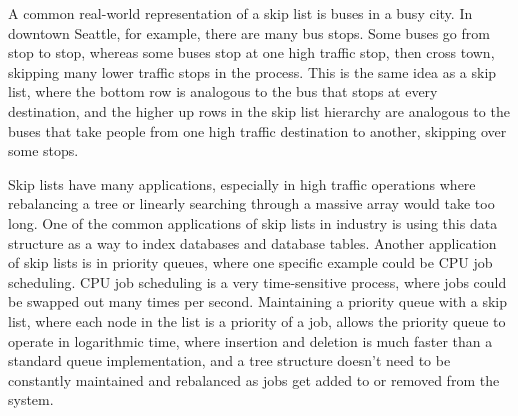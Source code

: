\documentclass{article}
\begin{document}
A common real-world representation of a skip list is buses in a busy city. In downtown Seattle, for example, there are many bus stops. Some buses go from stop to stop, whereas some buses stop at one high traffic stop, then cross town, skipping many lower traffic stops in the process. This is the same idea as a skip list, where the bottom row is analogous to the bus that stops at every destination, and the higher up rows in the skip list hierarchy are analogous to the buses that take people from one high traffic destination to another, skipping over some stops. 

Skip lists have many applications, especially in high traffic operations where rebalancing a tree or linearly searching through a massive array would take too long. One of the common applications of skip lists in industry is using this data structure as a way to index databases and database tables. Another application of skip lists is in priority queues, where one specific example could be CPU job scheduling. CPU job scheduling is a very time-sensitive process, where jobs could be swapped out many times per second. Maintaining a priority queue with a skip list, where each node in the list is a priority of a job, allows the priority queue to operate in logarithmic time, where insertion and deletion is much faster than a standard queue implementation, and a tree structure doesn’t need to be constantly maintained and rebalanced as jobs get added to or removed from the system.



\pagebreak
\end{document}
